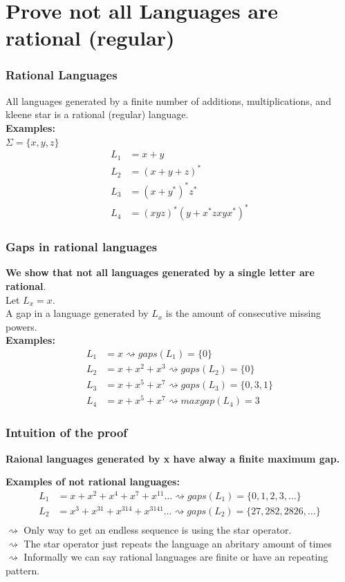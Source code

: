 \documentclass{beamer}
\begin{document}
\section{Prove not all Languages are rational (regular)}
\begin{frame}
  \frametitle{Rational Languages}
  All languages generated by a finite number of additions, multiplications, 
  and kleene star is a rational (regular) language.\\
  {\bf Examples:}\\
  $\Sigma = \{x, y, z\}$ 
  \begin{align}
    L_1 &= x+y \\
    L_2 &=(x+y+z)^* \\
    L_3 &= (x+y^*)^*z^*\\
    L_4 &=(xyz)^*(y+x^*zxyx^*)^*
  \end{align}
\end{frame}
\begin{frame}
  \frametitle{Gaps in rational languages}
  {\bf We show that not all languages generated 
  by a single letter are rational}.\\
  Let $L_x = x$.\\
  A gap in a language generated by $L_x$ is the
  amount of consecutive missing powers.\\
  {\bf Examples:}\\
  \begin{align*}
    L_1 &= x \rightsquigarrow gaps(L_1) = \{0\} \\ 
    L_2 &= x + x^2 + x^3 \rightsquigarrow gaps(L_2) = \{0\} \\
    L_3 &= x + x^5 + x^7 \rightsquigarrow gaps(L_3) = \{0,3,1\} \\
    L_4 &= x + x^5 + x^7 \rightsquigarrow maxgap(L_4) = 3
  \end{align*}
\end{frame}
\begin{frame}
  \frametitle{Intuition of the proof}
  {\bf Raional languages generated by x have alway a finite maximum gap.}
  
  {\bf Examples of not rational languages:}\\
  \begin{align*}
    L_1 &= x + x^2 + x^4 + x^7 + x^{11} 
    \dots \rightsquigarrow gaps(L_1) = \{0,1,2,3, \dots\} \\ 
    L_2 &= x^3 + x^{31} + x^{314} + x^{3141} \dots
    \rightsquigarrow gaps(L_2) = \{27, 282, 2826, \dots\} \\
  \end{align*}
  $\rightsquigarrow$ Only way to get an endless sequence is
    using the star operator.\\
  $\rightsquigarrow$ The star operator just repeats the language
  an abritary amount of times\\
  $\rightsquigarrow$ Informally we can say rational languages are finite or have an repeating pattern.
\end{frame}
\end{document}
